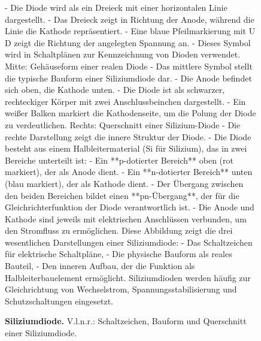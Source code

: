 {\begin{figure}[H]
\begin{minipage}[c]{0.25\textwidth}
{        - Die Diode wird als ein Dreieck mit einer horizontalen Linie dargestellt.  
        - Das Dreieck zeigt in Richtung der Anode, während die Linie die Kathode repräsentiert.  
        - Eine blaue Pfeilmarkierung mit  U D zeigt die Richtung der angelegten Spannung an.  
        - Dieses Symbol wird in Schaltplänen zur Kennzeichnung von Dioden verwendet.  
        Mitte: Gehäuseform einer realen Diode
        - Das mittlere Symbol stellt die typische Bauform einer Siliziumdiode dar.  
        - Die Anode befindet sich oben, die Kathode unten.  
        - Die Diode ist als schwarzer, rechteckiger Körper mit zwei Anschlussbeinchen dargestellt.  
        - Ein weißer Balken markiert die Kathodenseite, um die Polung der Diode zu verdeutlichen.  
        Rechts: Querschnitt einer Silizium-Diode 
        - Die rechte Darstellung zeigt die innere Struktur der Diode.  
        - Die Diode besteht aus einem Halbleitermaterial (Si für Silizium), das in zwei Bereiche unterteilt ist:  
        - Ein **p-dotierter Bereich** oben (rot markiert), der als Anode dient.  
        - Ein **n-dotierter Bereich** unten (blau markiert), der als Kathode dient.  
        - Der Übergang zwischen den beiden Bereichen bildet einen **pn-Übergang**, der für die Gleichrichterfunktion der Diode verantwortlich ist.  
        - Die Anode und Kathode sind jeweils mit elektrischen Anschlüssen verbunden, um den Stromfluss zu ermöglichen.  
        Diese Abbildung zeigt die drei wesentlichen Darstellungen einer Siliziumdiode:  
        - Das Schaltzeichen für elektrische Schaltpläne,  
        - Die physische Bauform als reales Bauteil,  
        - Den inneren Aufbau, der die Funktion als Halbleiterbauelement ermöglicht.  
        Siliziumdioden werden häufig zur Gleichrichtung von Wechselstrom, Spannungsstabilisierung und Schutzschaltungen eingesetzt.}
    \end{minipage}
    \label{fig:SiliziumDiode}
    \caption{\textbf{Siliziumdiode.} V.l.n.r.: Schaltzeichen, Bauform und Querschnitt einer Siliziumdiode.} 
\end{figure}
}
%
%
